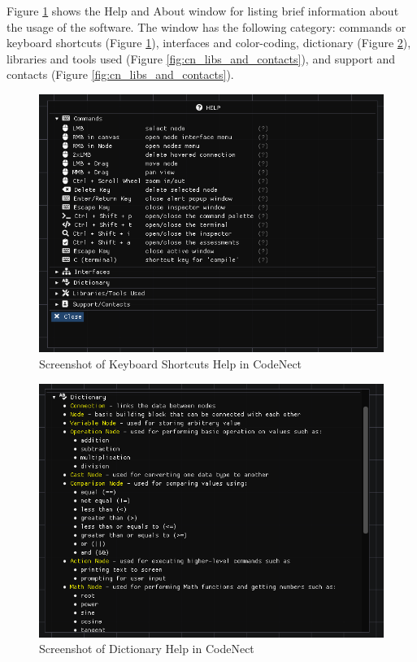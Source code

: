 \parx
Figure \ref{fig:cn_help_and_about} shows the Help and About window for listing
brief information about the usage of the software. The window has the following
category: commands or keyboard shortcuts (Figure \ref{fig:cn_help_and_about}),
interfaces and color-coding, dictionary (Figure \ref{fig:cn_help_dictionary}),
libraries and tools used (Figure \ref{fig:cn_libs_and_contacts}), and support and contacts
(Figure \ref{fig:cn_libs_and_contacts}).

\begin{figure}[H]
	\centering
	\captionsetup{justification=centering}
	\captionsetup[figure]{list=yes}
	\includegraphics[width=\linewidth]{media/sc_help_shortcuts.png}
	\caption[Screenshot of Keyboard Shortcuts Help in CodeNect]{Screenshot of Keyboard Shortcuts Help in CodeNect}
	\label{fig:cn_help_and_about}
\end{figure}

\begin{figure}[H]
	\centering
	\captionsetup{justification=centering}
	\captionsetup[figure]{list=yes}
	\includegraphics[width=\linewidth]{media/sc_help_dictionary.png}
	\caption[Screenshot of Dictionary Help in CodeNect]{Screenshot of Dictionary Help in CodeNect}
	\label{fig:cn_help_dictionary}
\end{figure}

